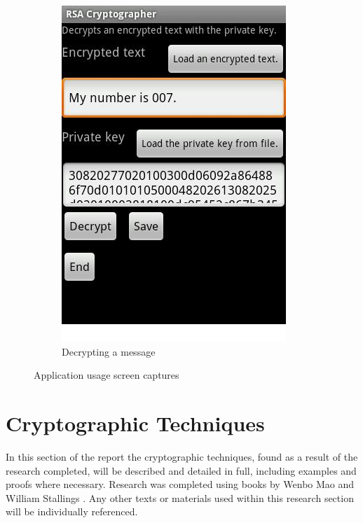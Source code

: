 \documentclass[a4paper,10pt]{report}
\begin{document}
\begin{figure}
\begin{subfigure}[b]{0.45\textwidth}
                \includegraphics[width=\textwidth]{images/cat1.jpg}
                \caption{Decrypting a message}
                \label{fig:cat1}
        \end{subfigure}
        \caption{Application usage screen captures}\label{fig:ciphercat}
\end{figure}

\section{Cryptographic Techniques}

In this section of the report the cryptographic techniques, found as a result of the research completed, will be described and detailed in full, including examples and proofs where necessary. Research was completed using books by Wenbo Mao \cite{wenbomao} and William Stallings \cite{willstallings}. Any other texts or materials used within this research section will be individually referenced. 
\end{document}
